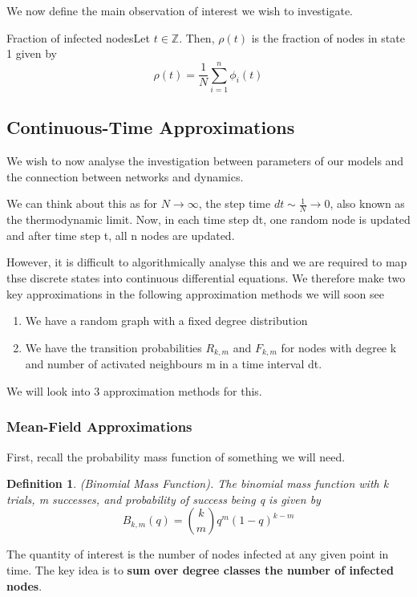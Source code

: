 \documentclass[twoside]{article}
\newtheorem{definition}[theorem]{Definition}
\begin{document}
We now define the main observation of interest we wish to investigate.
\begin{definition_exam}{Fraction of infected nodes}{}Let $t \in \mathbb{Z}.$ Then, $\rho(t)$ is the fraction of nodes in state 1 given by 
$$
\rho(t) = \frac{1}{N}\sum_{i=1}^{n}\phi_i(t)
$$
\end{definition_exam}


\subsection{Continuous-Time Approximations}
We wish to now analyse the investigation between parameters of our models and the connection between networks and dynamics.

We can think about this as for $N \rightarrow \infty$, the step time $dt \sim \frac{1}{N} \rightarrow 0$, also known as the thermodynamic limit. Now, in each time step dt, one random node is updated and after time step t, all n nodes are updated.

However, it is difficult to algorithmically analyse this and we are required to map thse discrete states into continuous differential equations. We therefore make two key approximations in the following approximation methods we will soon see 
\begin{enumerate}
\item We have a random graph with a fixed degree distribution 
\item We have the transition probabilities $R_{k,m}$ and $F_{k,m}$ for nodes with degree k and number of activated neighbours m in a time interval dt.
\end{enumerate}



We will look into 3 approximation methods for this.
\subsubsection{Mean-Field Approximations}

First, recall the probability mass function of something we will need.
\begin{definition}(Binomial Mass Function). The binomial mass function with k trials, m successes, and probability of success being q is given by 
$$
B_{k,m}(q) = {k \choose m}q^m(1 - q)^{k - m}
$$
\end{definition}

The quantity of interest is the number of nodes infected at any given point in time. The key idea is to \textbf{sum over degree classes the number of infected nodes}.
\end{document}
